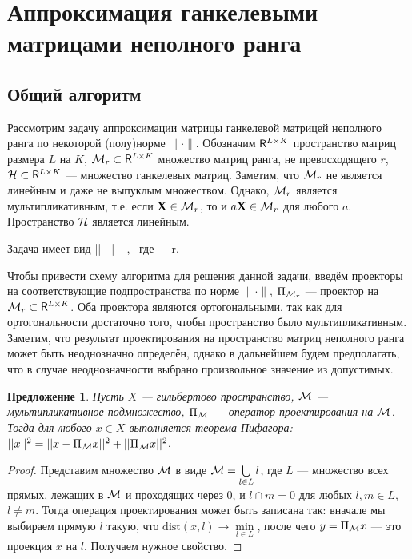 \documentclass[12pt,a4paper,fleqn,leqno]{article}
\newtheorem{proposition}{Предложение}%
\begin{document}
\section{Аппроксимация ганкелевыми матрицами неполного ранга}
\label{sec:lowrank_appr}
\subsection{Общий алгоритм}
Рассмотрим задачу аппроксимации матрицы ганкелевой матрицей неполного ранга по некоторой (полу)норме $\|\cdot\|$.
Обозначим $\mathsf{R}^{L\times K}$ пространство матриц размера $L$ на $K$, $\mathcal{M}_r\subset \mathsf{R}^{L\times K}$ множество матриц ранга, не превосходящего $r$,
$\mathcal{H} \subset \mathsf{R}^{L\times K}$ --- множество ганкелевых матриц.
Заметим, что  $\mathcal{M}_r$ не является линейным и даже не выпуклым множеством. Однако, $\mathcal{M}_r$ является мультипликативным, т.е.
если $\mathbf{X}\in \mathcal{M}_r$, то и $a\mathbf{X}\in \mathcal{M}_r$ для любого $a$.
Пространство $\mathcal{H}$ является линейным.

Задача имеет вид
\be
\label{eq:gen_task}
||\bfX - \bfY|| \to \min_\bfY, \mbox{\ где\ } \bfY \in \calH \cap \calM_r.
\ee

Чтобы привести схему алгоритма для решения данной задачи, введём проекторы на соответствующие подпространства
по норме $\|\cdot\|$, $\Pi_{\mathcal{M}_r}$ --- проектор на $\mathcal{M}_r\subset \mathsf{R}^{L\times K}$. Оба проектора являются ортогональными,
так как для ортогональности достаточно того, чтобы пространство было мультипликативным. Заметим, что результат проектирования
на пространство матриц неполного ранга может быть неоднозначно определён, однако в дальнейшем будем предполагать, что
в случае неоднозначности выбрано произвольное значение из допустимых.

\begin{proposition} \label{pythaprop}
Пусть $X$ --- гильбертово пространство, $\mathcal{M}$ --- мультипликативное подмножество, $\Pi_{\mathcal{M}}$ --- оператор проектирования на $\mathcal{M}$. Тогда для любого $x \in X$ выполняется теорема Пифагора: $||x||^2 = ||x - \Pi_{\mathcal{M}} x||^2 + ||\Pi_{\mathcal{M}} x||^2$.
\end{proposition}
\begin{proof}
Представим множество $\mathcal{M}$ в виде $\mathcal{M} = \bigcup\limits_{l \in L}l$, где $L$ --- множество всех прямых, лежащих в $\mathcal{M}$ и проходящих через $0$, и $l \cap m = 0$ для любых $l, m \in L$, $l \neq m$. Тогда операция проектирования может быть записана так: вначале мы выбираем прямую $l$ такую, что $\text{dist}(x, l) \rightarrow \min\limits_{l \in L}$, после чего $y = \Pi_{\mathcal{M}} x$ --- это проекция $x$ на $l$. Получаем нужное свойство.
\end{proof}
\end{document}
